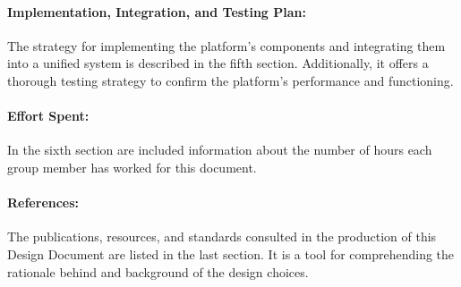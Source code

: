 \paragraph{Implementation, Integration, and Testing Plan:} The strategy for implementing the platform's components and integrating them into a unified system is described in the fifth section. Additionally, it offers a thorough testing strategy to confirm the platform's performance and functioning.

\paragraph{Effort Spent:} In the sixth section are included information about the number of hours each group member has worked for this document.

\paragraph{References:} The publications, resources, and standards consulted in the production of this Design Document are listed in the last section. It is a tool for comprehending the rationale behind and background of the design choices.